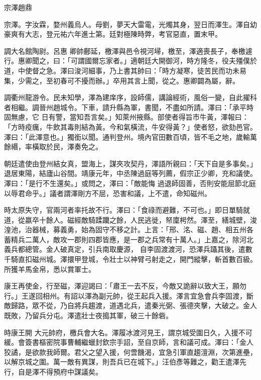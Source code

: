 
\begin{pinyinscope}

 宗澤趙鼎



 宗澤。字汝霖，婺州義烏人。母劉，夢天大雷電，光燭其身，翌日而澤生。澤自幼豪爽有大志，登元祐六年進士第。廷對極陳時弊，考官惡直，置末甲。



 調大名館陶尉。呂惠
 卿帥鄜延，檄澤與邑令視河埽，檄至，澤適喪長子，奉檄遽行。惠卿聞之，曰：「可謂國爾忘家者。」適朝廷大開御河，時方隆冬，役夫殭僕於道，中使督之急。澤曰浚河細事，乃上書其帥曰：「時方凝寒，徒苦民而功未易集，少需之，至初春可不擾而辦。」卒用其言上聞，從之。惠卿闢為屬，辭。



 調衢州龍游令。民未知學，澤為建庠序，設師儒，講論經術，風俗一變，自此擢科者相繼。調晉州趙城令。下車，請升縣為軍，書聞，不盡如所請。澤曰：「承平時固無慮，它
 日有警，當知吾言矣。」知萊州掖縣。部使者得旨市牛黃，澤報曰：「方時疫癘，牛飲其毒則結為黃。今和氣橫流，牛安得黃？」使者怒，欲劾邑官。澤曰：「此澤意也。」獨銜以聞。通判登州。境內官田數百頃，皆不毛之地，歲輸萬餘緡，率橫取於民，澤奏免之。



 朝廷遣使由登州結女真，盟海上，謀夾攻契丹，澤語所親曰：「天下自是多事矣。」退居東陽，結廬山谷間。靖康元年，中丞陳過庭等列薦，假宗正少卿，充和議使。澤曰：「是行不生還矣。」或問之，澤曰：「敵能悔
 過退師固善，否則安能屈節北庭以辱君命乎。」議者謂澤剛方不屈，恐害和議，上不遣，命知磁州。



 時太原失守，官兩河者率托故不行。澤曰：「食祿而避難，不可也。」即日單騎就道，從嬴卒十餘人。磁經敵騎蹂躪之餘，人民逃徙，帑廩枵然。澤至，繕城壁，浚湟池，治器械，募義勇，始為固守不移之計。上言：「邢、洺、磁、趙、相五州各蓄精兵二萬人，敵攻一郡則四郡皆應，是一郡之兵常有十萬人。」上嘉之，除河北義兵都總管。金人破真定，引兵南取慶源，
 自李固渡渡河，恐澤兵躡其後，遣數千騎直扣磁州城。澤擐甲登城，令壯士以神臂弓射走之，開門縱擊，斬首數百級。所獲羊馬金帛，悉以賞軍士。



 康王再使金，行至磁，澤迎謁曰：「肅王一去不反，今敵又詭辭以致大王，願勿行。」王遂回相州。有詔以澤為副元帥，從王起兵入援。澤言宜急會兵李固渡，斷敵歸路，眾不從，乃自將兵趨渡，道遇北兵，遣秦光弼、張德夾擊，大破之。金人既敗，乃留兵分屯。澤遣壯士夜搗其軍，破三十餘砦。



 時康王開
 大元帥府，檄兵會大名。澤履冰渡河見王，謂京城受圍日久，入援不可緩。會簽書樞密院事曹輔繼蠟封欽宗手詔，至自京師，言和議可成。澤曰：「金人狡譎，是欲款我師爾。君父之望入援，何啻饑渴，宜急引軍直趨澶淵，次第進壘，以解京城之圍。萬一敵有異謀，則吾兵已在城下。」汪伯彥等難之，勸王遣澤先行，自是澤不得預府中謀議矣。




\end{pinyinscope}

